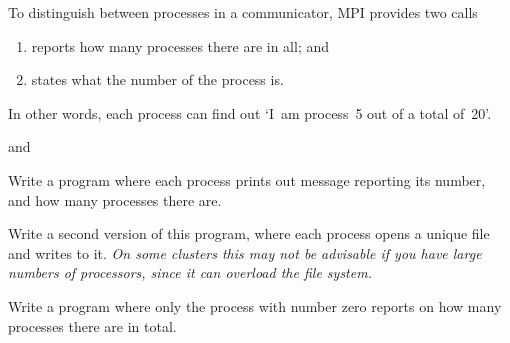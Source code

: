 To distinguish between processes in a communicator, MPI provides two calls
\begin{enumerate}
\item {} reports how many processes there are in all; and
\item {} states what the number of the process is.
\end{enumerate}
In other words, each process can find out `I~am process~5
out of a total of~20'.

%
and
%

\begin{exercise}
  \label{ex:hello3}
  Write a program where each process prints out message
  reporting its number, and how many processes there are.

  Write a second version of this program, where each process opens a
  unique file and writes to it. \emph{On some clusters this may not be
    advisable if you have large numbers of processors, since it can
    overload the file system.}
\end{exercise}

\begin{exercise}
  \label{ex:hello4}
  Write a program where only the process with number zero
  reports on how many processes there are in total.
\end{exercise}

\endinput
This is probably about the simplest MPI program:
\verbatimsnippet{hello}
%
\verbatimsnippet{hellop}

